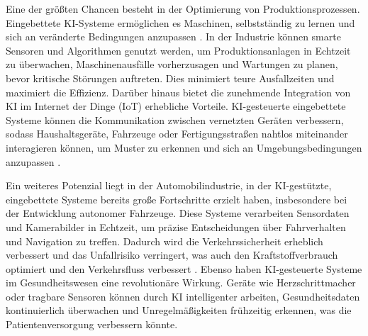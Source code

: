 Eine der größten Chancen besteht in der Optimierung von Produktionsprozessen. Eingebettete KI-Systeme ermöglichen es Maschinen, selbstständig zu lernen und sich an veränderte Bedingungen anzupassen \cite{Gembaczka.2019}. In der Industrie können smarte Sensoren und Algorithmen genutzt werden, um Produktionsanlagen in Echtzeit zu überwachen, Maschinenausfälle vorherzusagen und Wartungen zu planen, bevor kritische Störungen auftreten. Dies minimiert teure Ausfallzeiten und maximiert die Effizienz. Darüber hinaus bietet die zunehmende Integration von KI im Internet der Dinge (IoT) erhebliche Vorteile. KI-gesteuerte eingebettete Systeme können die Kommunikation zwischen vernetzten Geräten verbessern, sodass Haushaltsgeräte, Fahrzeuge oder Fertigungsstraßen nahtlos miteinander interagieren können, um Muster zu erkennen und sich an Umgebungsbedingungen anzupassen \cite{Hamblen.2013}.

Ein weiteres Potenzial liegt in der Automobilindustrie, in der KI-gestützte, eingebettete Systeme bereits große Fortschritte erzielt haben, insbesondere bei der Entwicklung autonomer Fahrzeuge. Diese Systeme verarbeiten Sensordaten und Kamerabilder in Echtzeit, um präzise Entscheidungen über Fahrverhalten und Navigation zu treffen. Dadurch wird die Verkehrssicherheit erheblich verbessert und das Unfallrisiko verringert, was auch den Kraftstoffverbrauch optimiert und den Verkehrsfluss verbessert \cite{Koricanac.2021}. Ebenso haben KI-gesteuerte Systeme im Gesundheitswesen eine revolutionäre Wirkung. Geräte wie Herzschrittmacher oder tragbare Sensoren können durch KI intelligenter arbeiten, Gesundheitsdaten kontinuierlich überwachen und Unregelmäßigkeiten frühzeitig erkennen, was die Patientenversorgung verbessern könnte.

